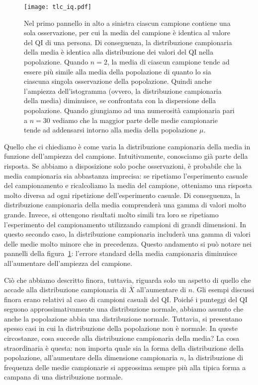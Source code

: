 \begin{figure}[h!]
\centering
\texttt{[image: tlc\_iq.pdf]}
\caption{
Nel primo pannello in alto a sinistra ciascun campione contiene una sola osservazione, per cui la media del campione è identica al valore del QI di una persona. 
Di conseguenza, la distribuzione campionaria della media è identica alla distribuzione dei valori del QI nella popolazione.
Quando $n=2$, la media di ciascun campione tende ad essere più simile alla media della popolazione di quanto lo sia ciascuna singola osservazione della popolazione. 
Quindi anche l'ampiezza dell'istogramma (ovvero, la distribuzione campionaria della media) diminuisce, se confrontata con la dispersione della popolazione. 
Quando giungiamo ad una numerosità campionaria pari a $n=30$ vediamo che la maggior parte delle medie campionarie tende ad addensarsi intorno alla media della popolazione $\mu$.
}
\label{fig_tlc_iq}
\end{figure}

Quello che ci chiediamo è come varia la distribuzione campionaria della media in funzione dell'ampiezza del campione. 
Intuitivamente, conosciamo già parte della risposta. 
Se abbiamo a disposizione solo poche osservazioni, è probabile che la media campionaria sia abbastanza imprecisa: se ripetiamo l'esperimento casuale del campionamento e ricalcoliamo la media del campione, otteniamo una risposta molto diversa ad ogni ripetizione dell'esperimento casuale. 
Di conseguenza, la distribuzione campionaria della media comprenderà una gamma di valori molto grande.
Invece, si ottengono risultati molto simili tra loro se ripetiamo l'esperimento del campionamento utilizzando campioni di grandi dimensioni. 
In questo secondo caso, la distribuzione campionaria includerà una gamma di valori delle medie molto minore che in precedenza.
Questo andamento si può notare nei pannelli della figura~\ref{fig_tlc_iq}: l'errore standard della media campionaria diminuisce all'aumentare dell'ampiezza del campione.

Ciò che abbiamo descritto finora, tuttavia, riguarda solo un aspetto di quello che accade alla distribuzione campionaria di $\bar{X}$ all'aumentare di $n$.
Gli esempi discussi finora erano relativi al caso di campioni casuali del QI.
Poiché i punteggi del QI seguono approssimativamente una distribuzione normale, abbiamo assunto che anche la popolazione abbia una distribuzione normale. 
Tuttavia, si  presentano  spesso  casi  in  cui  la  distribuzione  della popolazione non è normale. 
In queste circostanze, cosa succede alla distribuzione campionaria della media? 
La cosa straordinaria è questa: non importa quale sia la forma della distribuzione della popolazione, all'aumentare della dimensione campionaria $n$, la distribuzione di frequenza delle medie campionarie si approssima sempre più alla tipica forma a campana di una distribuzione normale. 

